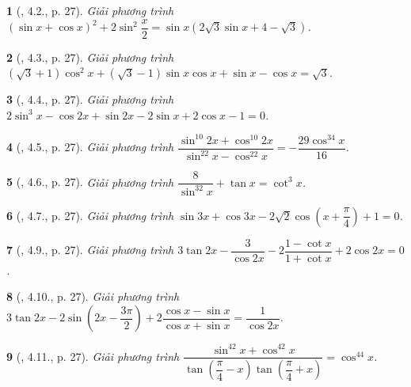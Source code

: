 \documentclass{article}
\newtheorem{baitoan}{}
\begin{document}
\begin{baitoan}[\cite{Hung_nang_cao_phat_trien_Toan_11_tap_1}, 4.2., p. 27]
	Giải phương trình $(\sin x + \cos x)^2 + 2\sin^2\dfrac{x}{2} = \sin x(2\sqrt{3}\sin x + 4 - \sqrt{3})$.
\end{baitoan}

\begin{baitoan}[\cite{Hung_nang_cao_phat_trien_Toan_11_tap_1}, 4.3., p. 27]
	Giải phương trình $(\sqrt{3} + 1)\cos^2x + (\sqrt{3} - 1)\sin x\cos x + \sin x - \cos x = \sqrt{3}$.
\end{baitoan}

\begin{baitoan}[\cite{Hung_nang_cao_phat_trien_Toan_11_tap_1}, 4.4., p. 27]
	Giải phương trình $2\sin^3x - \cos2x + \sin2x - 2\sin x + 2\cos x - 1 = 0$.
\end{baitoan}

\begin{baitoan}[\cite{Hung_nang_cao_phat_trien_Toan_11_tap_1}, 4.5., p. 27]
	Giải phương trình $\dfrac{\sin^{10}2x + \cos^{10}2x}{\sin^22x - \cos^22x} = -\dfrac{29\cos^34x}{16}$.
\end{baitoan}

\begin{baitoan}[\cite{Hung_nang_cao_phat_trien_Toan_11_tap_1}, 4.6., p. 27]
	Giải phương trình $\dfrac{8}{\sin^32x} + \tan x = \cot^3x$.
\end{baitoan}

\begin{baitoan}[\cite{Hung_nang_cao_phat_trien_Toan_11_tap_1}, 4.7., p. 27]
	Giải phương trình $\sin3x + \cos3x - 2\sqrt{2}\cos\left(x + \dfrac{\pi}{4}\right) + 1 = 0$.
\end{baitoan}

\begin{baitoan}[\cite{Hung_nang_cao_phat_trien_Toan_11_tap_1}, 4.9., p. 27]
	Giải phương trình $3\tan2x - \dfrac{3}{\cos2x} - 2\dfrac{1 - \cot x}{1 + \cot x} + 2\cos2x = 0$.
\end{baitoan}

\begin{baitoan}[\cite{Hung_nang_cao_phat_trien_Toan_11_tap_1}, 4.10., p. 27]
	Giải phương trình $3\tan2x - 2\sin\left(2x - \dfrac{3\pi}{2}\right) + 2\dfrac{\cos x - \sin x}{\cos x + \sin x} = \dfrac{1}{\cos2x}$.
\end{baitoan}

\begin{baitoan}[\cite{Hung_nang_cao_phat_trien_Toan_11_tap_1}, 4.11., p. 27]
	Giải phương trình $\dfrac{\sin^42x + \cos^42x}{\tan\left(\dfrac{\pi}{4} - x\right)\tan\left(\dfrac{\pi}{4} + x\right)} = \cos^44x$.
\end{baitoan}
\end{document}
